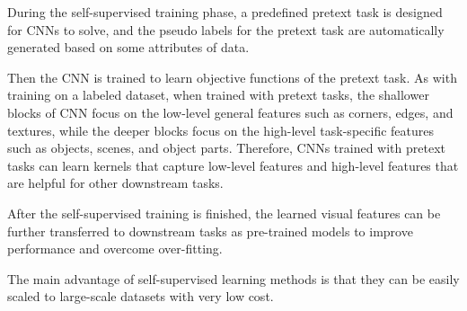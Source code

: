 During the self-supervised training phase, a predefined pretext task is designed
for CNNs to solve, and the pseudo labels for the pretext task are automatically
generated based on some attributes of data.

Then the CNN is trained to learn objective functions of the pretext task. As with
training on a labeled dataset, when trained with pretext tasks, the shallower
blocks of CNN focus on the low-level general features such as corners, edges, and
textures, while the deeper blocks focus on the high-level task-specific features
such as objects, scenes, and object parts. Therefore, CNNs trained with pretext
tasks can learn kernels that capture low-level features and high-level features
that are helpful for other downstream tasks.

After the self-supervised training is finished, the learned visual features can
be further transferred to downstream tasks as pre-trained models to improve
performance and overcome over-fitting.

The main advantage of self-supervised learning methods is that they can be easily
scaled to large-scale datasets with very low cost.

